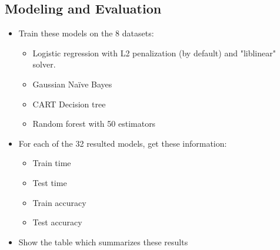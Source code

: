 \documentclass[11pt, a4paper]{article}
\begin{document}
\begin{multicols}{2}
\section{Modeling and Evaluation}

\begin{itemize}
	\item Train these models on the 8 datasets:
	\begin{itemize}
		\item Logistic regression with L2 penalization (by default) and "liblinear" solver.
		\item Gaussian Naïve Bayes 
		\item CART Decision tree
		\item Random forest with 50 estimators
	\end{itemize}
	\item For each of the 32 resulted models, get these information:
	\begin{itemize}
		\item Train time
		\item Test time
		\item Train accuracy
		\item Test accuracy
	\end{itemize}
	\item Show the table which summarizes these results
\end{itemize}


\end{multicols}
\end{document}
